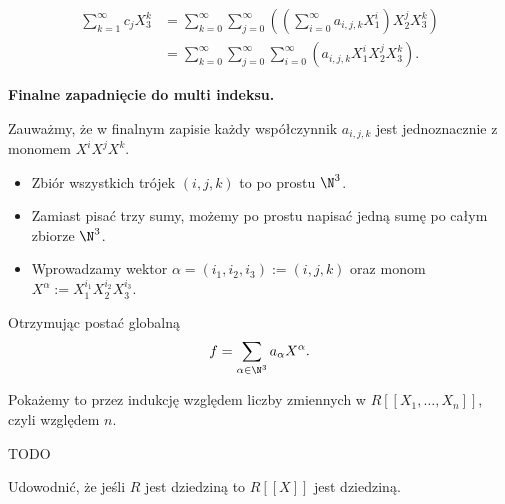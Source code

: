 \begin{intuition}
\begin{align*}
		\sum_{k=1}^{\infty} c_{j}X_{3}^{k} &= \sum_{k=0}^{\infty}\sum_{j=0}^{\infty}\left( \left(\sum_{i=0}^{\infty}a_{i,j,k}X_{1}^{i} \right)X_{2}^{j}X_{3}^{k}\right) \\	
		       &=\sum_{k=0}^{\infty}\sum_{j=0}^{\infty} \sum_{i=0}^{\infty}\left(a_{i,j,k}X_{1}^{i} X_{2}^{j}X_{3}^{k}\right)
.\end{align*}

\noindent \textbf{Finalne zapadnięcie do multi indeksu.} 

Zauważmy, że w finalnym zapisie każdy współczynnik $a_{i,j,k}$ jest jednoznacznie z monomem $X^{i}X^{j}X^{k}$.
\begin{itemize}
	\item Zbiór wszystkich trójek $\left( i,j,k \right) $ to po prostu $\N^3$.
	\item Zamiast pisać trzy sumy, możemy po prostu napisać jedną sumę po całym zbiorze $\N^3$.
	\item Wprowadzamy wektor $\alpha = \left( i_1,i_2,i_3 \right) := \left( i,j,k \right) $ oraz monom $X^{\alpha } := X_{1}^{i_1}X_{2}^{i_2}X_{3}^{i_3}$.
\end{itemize}
	Otrzymując postać globalną 
	\[
	f = \sum_{\alpha \in \N^3} a_{\alpha }X^{\alpha }
	.\] 
\end{intuition} 
\begin{solution}
Pokażemy to przez indukcję względem liczby zmiennych w $R\left[ \left[ X_1,\ldots, X_{n} \right]  \right] $, czyli względem $n$.

TODO
\end{solution} 
\begin{problem}[4]
	Udowodnić, że jeśli $R$ jest dziedziną to $R\left[ \left[ X \right]  \right] $ jest dziedziną.
\end{problem} 
